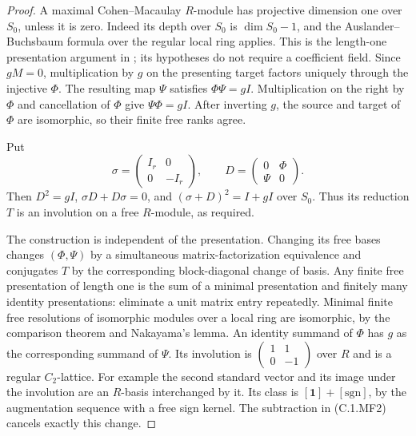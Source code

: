 \begin{proof}
A maximal Cohen--Macaulay $R$-module has projective
dimension one over $S_0$, unless it is zero.
Indeed its depth over $S_0$ is $\dim S_0-1$, and
the Auslander--Buchsbaum formula over the regular local
ring applies.  This is the length-one presentation
argument in \cite[proof of Theorem 6.1, p.\ 53,
and Corollary 6.3, p.\ 55]{C-Eisenbud1980}; its hypotheses
do not require a coefficient field.
Since $gM=0$, multiplication by $g$ on the presenting
target factors uniquely through the injective $\Phi$.
The resulting map $\Psi$ satisfies $\Phi\Psi=gI$.
Multiplication on the right by $\Phi$ and cancellation
of $\Phi$ give $\Psi\Phi=gI$.
After inverting $g$, the source and target of $\Phi$
are isomorphic, so their finite free ranks agree.

Put
\[
 \sigma=\begin{pmatrix}I_r&0\\0&-I_r\end{pmatrix},
 \qquad D=\begin{pmatrix}0&\Phi\\\Psi&0\end{pmatrix}.
\]
Then $D^2=gI$, $\sigma D+D\sigma=0$, and
$(\sigma+D)^2=I+gI$ over $S_0$.
Thus its reduction $T$ is an involution on a free
$R$-module, as required.

The construction is independent of the presentation.
Changing its free bases changes $(\Phi,\Psi)$ by a
simultaneous matrix-factorization equivalence and conjugates
$T$ by the corresponding block-diagonal change of basis.
Any finite free presentation of length one is the sum
of a minimal presentation and finitely many identity
presentations: eliminate a unit matrix entry repeatedly.
Minimal finite free resolutions of isomorphic modules over
a local ring are isomorphic, by the comparison theorem
and Nakayama's lemma.
An identity summand of $\Phi$ has $g$ as the corresponding
summand of $\Psi$.  Its involution is
$\left(\begin{smallmatrix}1&1\\0&-1\end{smallmatrix}\right)$
over $R$ and is a regular $C_2$-lattice.
For example the second standard vector and its image
under the involution are an $R$-basis interchanged by it.
Its class is $[\mathbf1]+[\mathrm{sgn}]$, by the
augmentation sequence with a free sign kernel.
The subtraction in (C.1.MF2) cancels exactly this change.


\end{proof}
